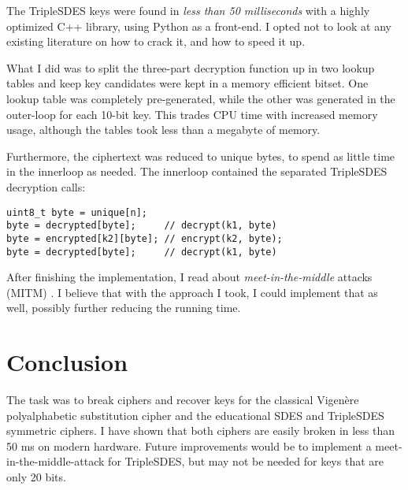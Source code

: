\documentclass[a4paper,english,12pt]{article}
\begin{document}
The TripleSDES keys were found in \textit{less than 50 milliseconds} with a highly optimized
C++ library, using Python as a front-end. I opted not to look at any existing
literature on how to crack it, and how to speed it up.

What I did was to split the three-part decryption function up in two lookup
tables and keep key candidates were kept in a memory efficient bitset. One
lookup table was completely pre-generated, while the other was generated in the
outer-loop for each 10-bit key. This trades CPU time with increased memory
usage, although the tables took less than a megabyte of memory.

Furthermore, the ciphertext was reduced to unique bytes, to spend as little
time in the innerloop as needed. The innerloop contained the separated
TripleSDES decryption calls:

\begin{verbatim}
uint8_t byte = unique[n];
byte = decrypted[byte];     // decrypt(k1, byte)
byte = encrypted[k2][byte]; // encrypt(k2, byte);
byte = decrypted[byte];     // decrypt(k1, byte)
\end{verbatim}

After finishing the implementation, I read about \textit{meet-in-the-middle}
attacks (MITM) \cite{wiki:mitm, wiki:mitm2}. I believe that with the approach I
took, I could implement that as well, possibly further reducing the running
time.

\section{Conclusion}

The task was to break ciphers and recover keys for the classical Vigenère
polyalphabetic substitution cipher and the educational SDES and TripleSDES
symmetric ciphers. I have shown that both ciphers are easily broken in less
than 50 ms on modern hardware. Future improvements would be to implement a
meet-in-the-middle-attack for TripleSDES, but may not be needed for keys that
are only 20 bits.



\end{document}
